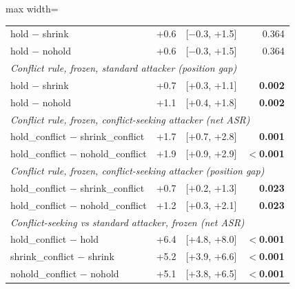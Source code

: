 \begin{table}[t]
{\begin{adjustbox}{max width=\linewidth}
\begin{tabular}{lrrr}
hold $-$ shrink & +0.6 & [$-$0.3, +1.5] & 0.364 \\
hold $-$ nohold & +0.6 & [$-$0.3, +1.5] & 0.364 \\
\midrule
\multicolumn{4}{l}{\textit{Conflict rule, frozen, standard attacker (position gap)}} \\
hold $-$ shrink & +0.7 & [+0.3, +1.1] & \textbf{0.002} \\
hold $-$ nohold & +1.1 & [+0.4, +1.8] & \textbf{0.002} \\
\midrule
\multicolumn{4}{l}{\textit{Conflict rule, frozen, conflict-seeking attacker (net ASR)}} \\
hold\_conflict $-$ shrink\_conflict & +1.7 & [+0.7, +2.8] & \textbf{0.001} \\
hold\_conflict $-$ nohold\_conflict & +1.9 & [+0.9, +2.9] & \textbf{$<$0.001} \\
\midrule
\multicolumn{4}{l}{\textit{Conflict rule, frozen, conflict-seeking attacker (position gap)}} \\
hold\_conflict $-$ shrink\_conflict & +0.7 & [+0.2, +1.3] & \textbf{0.023} \\
hold\_conflict $-$ nohold\_conflict & +1.2 & [+0.3, +2.1] & \textbf{0.023} \\
\midrule
\multicolumn{4}{l}{\textit{Conflict-seeking vs standard attacker, frozen (net ASR)}} \\
hold\_conflict $-$ hold & +6.4 & [+4.8, +8.0] & \textbf{$<$0.001} \\
shrink\_conflict $-$ shrink & +5.2 & [+3.9, +6.6] & \textbf{$<$0.001} \\
nohold\_conflict $-$ nohold & +5.1 & [+3.8, +6.5] & \textbf{$<$0.001} \\
\bottomrule
\end{tabular}
\end{adjustbox}
}
\end{table}